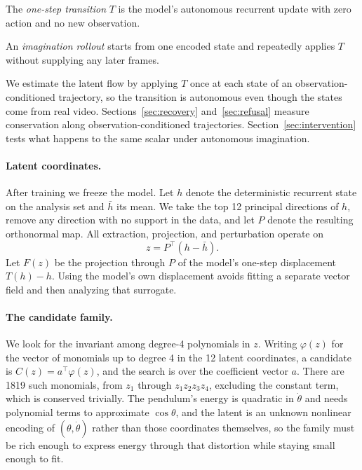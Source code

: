 The \emph{one-step transition} $T$ is the model's autonomous recurrent update with zero action and
no new observation.

An \emph{imagination rollout} starts from one encoded state and repeatedly applies $T$ without
supplying any later frames.

We estimate the latent flow by applying $T$ once at each state of an observation-conditioned
trajectory, so the transition is autonomous even though the states come from real video.
Sections~\ref{sec:recovery} and~\ref{sec:refusal} measure conservation along observation-conditioned
trajectories. Section~\ref{sec:intervention} tests what happens to the same scalar under autonomous
imagination.

\paragraph{Latent coordinates.} After training we freeze the model. Let $h$ denote the deterministic
recurrent state on the analysis set and $\bar h$ its mean. We take the top 12 principal directions
of $h$, remove any direction with no support in the data, and let $P$ denote the resulting
orthonormal map. All extraction, projection, and perturbation operate on
\begin{equation}
z = P^\top(h-\bar h).
\label{eq:z}
\end{equation}
Let $F(z)$ be the projection through $P$ of the model's one-step displacement $T(h)-h$. Using the
model's own displacement avoids fitting a separate vector field and then analyzing that surrogate.

\paragraph{The candidate family.} We look for the invariant among degree-4 polynomials in $z$.
Writing $\varphi(z)$ for the vector of monomials up to degree 4 in the 12 latent coordinates, a
candidate is $C(z) = a^\top\varphi(z)$, and the search is over the coefficient vector $a$. There are
1819 such monomials, from $z_1$ through $z_1z_2z_3z_4$, excluding the constant term, which is
conserved trivially. The pendulum's energy is quadratic in $\dot\theta$ and needs polynomial terms
to approximate $\cos\theta$, and the latent is an unknown nonlinear encoding of
$(\theta, \dot\theta)$ rather than those coordinates themselves, so the family must be rich enough
to express energy through that distortion while staying small enough to fit.

